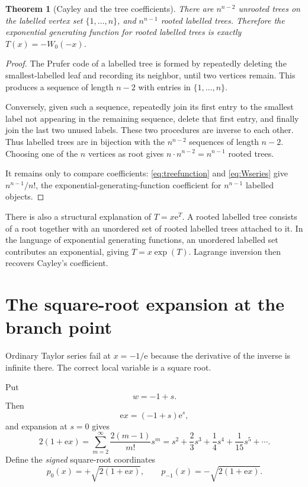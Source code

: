 \documentclass[11pt]{article}
\newtheorem{theorem}{Theorem}[section]
\theoremstyle{remark}
\newcommand{\Wz}{W_0}
\newcommand{\ee}{\mathrm e}
\begin{document}
\begin{theorem}[Cayley and the tree coefficients]\label{thm:cayley}
There are \(n^{n-2}\) unrooted trees on the labelled vertex set
\(\{1,\ldots,n\}\), and \(n^{n-1}\) rooted labelled trees.  Therefore the
exponential generating function for rooted labelled trees is exactly
\(T(x)=-\Wz(-x)\).
\end{theorem}

\begin{proof}
The Prufer code of a labelled tree is formed by repeatedly deleting the
smallest-labelled leaf and recording its neighbor, until two vertices
remain.  This produces a sequence of length \(n-2\) with entries in
\(\{1,\ldots,n\}\).

Conversely, given such a sequence, repeatedly join its first entry to the
smallest label not appearing in the remaining sequence, delete that first
entry, and finally join the last two unused labels.  These two procedures
are inverse to each other.  Thus labelled trees are in bijection with the
\(n^{n-2}\) sequences of length \(n-2\).  Choosing one of the \(n\) vertices
as root gives \(n\cdot n^{n-2}=n^{n-1}\) rooted trees.

It remains only to compare coefficients: \eqref{eq:treefunction} and
\eqref{eq:Wseries} give \(n^{n-1}/n!\), the exponential-generating-function
coefficient for \(n^{n-1}\) labelled objects.
\end{proof}

There is also a structural explanation of \(T=x\ee^T\).  A rooted labelled
tree consists of a root together with an unordered set of rooted labelled
trees attached to it.  In the language of exponential generating functions,
an unordered labelled set contributes an exponential, giving
\(T=x\exp(T)\).  Lagrange inversion then recovers Cayley's coefficient.


\section{The square-root expansion at the branch point}\label{sec:branchpoint}

Ordinary Taylor series fail at \(x=-1/\ee\) because the derivative of the
inverse is infinite there.  The correct local variable is a square root.

Put
\[
       w=-1+s.
\]
Then
\[
 \ee x=(-1+s)\ee^s,
\]
and expansion at \(s=0\) gives
\begin{equation}\label{eq:p-s-relation}
 2(1+\ee x)
 =\sum_{m=2}^{\infty}\frac{2(m-1)}{m!}s^m
 =s^2+\frac23s^3+\frac14s^4+\frac1{15}s^5+\cdots.
\end{equation}
Define the \emph{signed} square-root coordinates
\begin{equation}\label{eq:signedp}
 p_0(x)=+\sqrt{2(1+\ee x)},\qquad
 p_{-1}(x)=-\sqrt{2(1+\ee x)}.
\end{equation}
\end{document}
